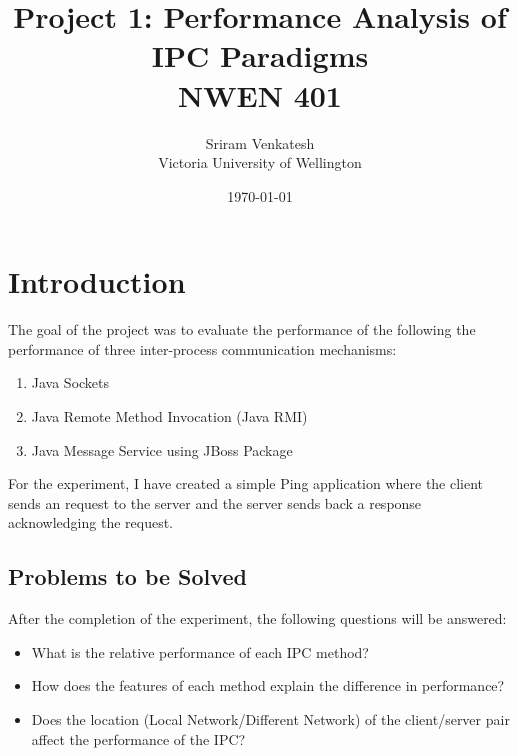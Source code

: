 \documentclass{article}
\title{Project 1: Performance Analysis of IPC Paradigms \\ NWEN 401} %
\author{Sriram Venkatesh \\ Victoria University of Wellington} %
\date{\today} %
\begin{document}
\maketitle %





\section{Introduction}
The goal of the project was to evaluate the performance of the following the performance of three inter-process communication mechanisms:

\begin{enumerate}
	\item Java Sockets
	\item Java Remote Method Invocation (Java RMI)
	\item Java Message Service using JBoss Package
\end{enumerate}

For the experiment, I have created a simple Ping application where the client sends an request to the server and the server sends back a response acknowledging the request. \\

\subsection{Problems to be Solved}
After the completion of the experiment, the following questions will be answered:
\begin{itemize}
	\item What is the relative performance of each IPC method?
	\item How does the features of each method explain the difference in performance?	
	\item Does the location (Local Network/Different Network) of the client/server pair affect the performance of the IPC?
\end{itemize}
\end{document}
